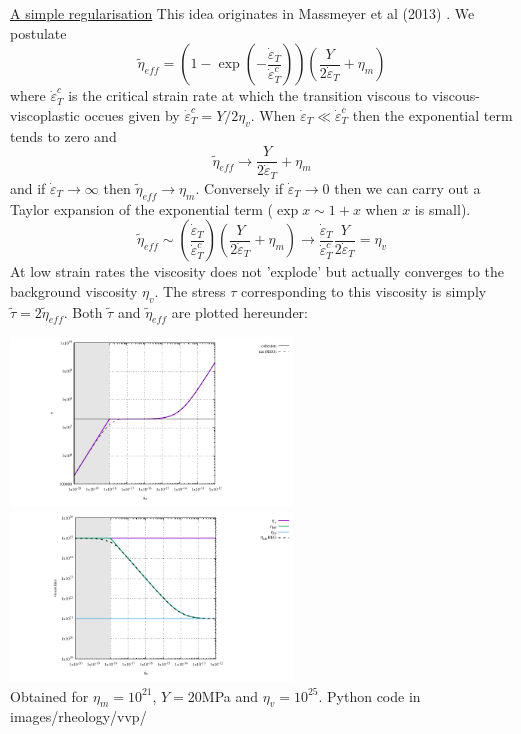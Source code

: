 \begin{itemize}
\underline{A simple regularisation} This idea originates in Massmeyer et al (2013) \cite{madd13}. We postulate
\[
\tilde{\eta}_{eff} = \left(  1 - \exp (- \frac{\dot\varepsilon_T}{\dot\varepsilon_{T}^c}) \right)
\left( \frac{Y}{2 \dot\varepsilon_T} + \eta_m \right)
\]
where $\dot\varepsilon_{T}^c$ is the critical strain  rate at which the transition viscous to 
viscous-viscoplastic occues given by $\dot\varepsilon_{T}^c=Y/2\eta_v$.
When $\dot\varepsilon_{T} \ll \dot\varepsilon_{T}^c$ then the exponential term tends to zero and 
\[
\tilde{\eta}_{eff} \rightarrow  \frac{Y}{2 \dot\varepsilon_T} + \eta_m 
\]
and if $\dot\varepsilon_{T} \rightarrow \infty$ then $\tilde{\eta}_{eff}\rightarrow \eta_m$.
Conversely if $\dot\varepsilon_T \rightarrow 0$ then we can carry out a Taylor expansion of the exponential 
term ($\exp x \sim 1 + x$ when $x$ is small).
\[
\tilde{\eta}_{eff} \sim \left(  \frac{\dot\varepsilon_T}{\dot\varepsilon_{T}^c} \right)
\left( \frac{Y}{2 \dot\varepsilon_T} + \eta_m \right)
\rightarrow 
\frac{\dot\varepsilon_T}{\dot\varepsilon_{T}^c}  \frac{Y}{2 \dot\varepsilon_T}  = \eta_v
\]
At low strain rates the viscosity does not 'explode' but actually converges to the background viscosity $\eta_v$.
The stress $\tau$ corresponding to this viscosity is simply $\tilde{\tau} = 2 \tilde{\eta}_{eff}$. 
Both $\tilde{\tau}$ and $ \tilde{\eta}_{eff}$ are plotted hereunder:


\begin{center}
\includegraphics[width=7.5cm]{images/rheology/vvp/tau_reg.pdf}
\includegraphics[width=7.5cm]{images/rheology/vvp/viscosities_reg.pdf}\\
{\captionfont Obtained for $\eta_m=10^{21}$, $Y=20$MPa and $\eta_v=10^{25}$. Python code 
in images/rheology/vvp/}
\end{center}



\end{itemize}
